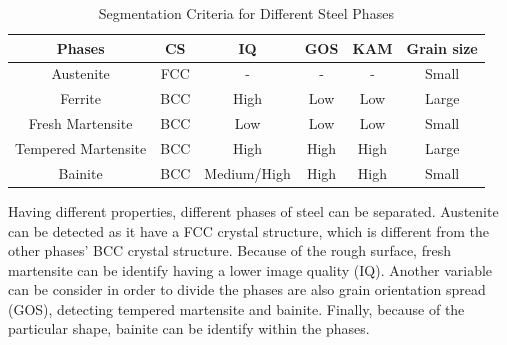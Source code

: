 \begin{table}[h]
    \centering
    \captionsetup{justification=centering,margin=2cm}
    \caption{Segmentation Criteria for Different Steel Phases}
    \begin{tabular}{| c | c | c | c | c | c | }
         \hline
          Phases  &  CS  &  IQ  &  GOS  &  KAM & Grain size  \\
         \hline
        Austenite & FCC & - & - & - & Small\\
         \hline
         Ferrite & BCC & High & Low & Low & Large \\
         \hline
         Fresh Martensite & BCC & Low & Low & Low & Small\\
         \hline
         Tempered Martensite & BCC & High & High & High & Large \\
         \hline
         Bainite & BCC & Medium/High & High & High & Small \\
         \hline
         
    \end{tabular}
    \label{segmentation}
\end{table}

Having different properties, different phases of steel can be separated. Austenite can be detected as it have a FCC crystal structure, which is different from the other phases' BCC crystal structure. Because of the rough surface, fresh martensite can be identify having a lower image quality (IQ). Another variable can be consider in order to divide the phases are also grain orientation spread (GOS), detecting tempered martensite and bainite. Finally, because of the particular shape, bainite can be identify within the phases.

